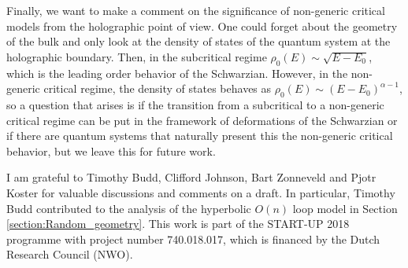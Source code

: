 \documentclass[a4paper,11pt]{article}
\begin{document}
Finally, we want to make a comment on the significance of non-generic critical models from the holographic point of view. One could forget about the geometry of the bulk and only look at the density of states of the quantum system at the holographic boundary. Then, in the subcritical regime $\rho_0(E)\sim\sqrt{E-E_0}$, which is the leading order behavior of the Schwarzian. However, in the non-generic critical regime, the density of states behaves as $\rho_0(E)\sim (E-E_0)^{\alpha-1}$, so a question that arises is if the transition from a subcritical to a non-generic critical regime can be put in the framework of deformations of the Schwarzian or if there are quantum systems that naturally present this the non-generic critical behavior, but we leave this for future work. 


\acknowledgments
I am grateful to Timothy Budd, Clifford Johnson, Bart Zonneveld and Pjotr Koster for valuable discussions and comments on a draft. In particular, Timothy Budd contributed to the analysis of the hyperbolic $O(n)$ loop model in Section \ref{section:Random_geometry}. This work is part of the START-UP 2018 programme with project number 740.018.017, which is financed by the Dutch Research Council (NWO).





\end{document}
